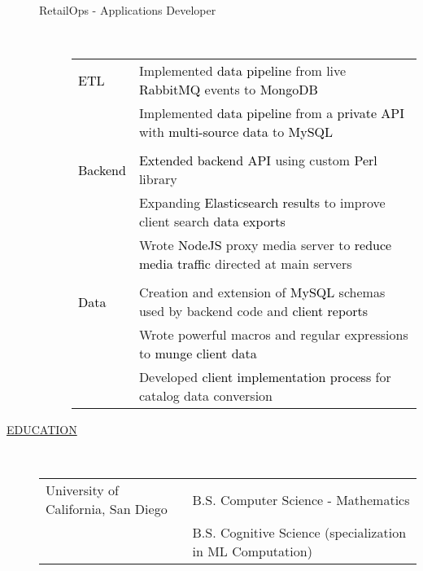 \documentclass[11pt]{article}
\begin{document}
\begin{description}
\begin{description}
                \item[RetailOps - Applications Developer] \hfill\\
                \textcolor{gray}{
                    \begin{tabular}{l|l}
                        \\[-1.0mm]
                        \textcolor{black}{ETL}
                            & Implemented \textcolor{black}{data pipeline} from live \textcolor{black}{RabbitMQ} events to \textcolor{black}{MongoDB}\\
                            & Implemented \textcolor{black}{data pipeline} from a \textcolor{black}{private API} with \textcolor{black}{multi-source data} to \textcolor{black}{MySQL}\\
                        \\[-1.7mm]
                        \textcolor{black}{Backend}
                            & \textcolor{black}{Extended backend API} using custom \textcolor{black}{Perl} library\\
                            & Expanding \textcolor{black}{Elasticsearch results} to improve client search \textcolor{black}{data exports}\\
                            & Wrote \textcolor{black}{NodeJS} proxy media server to \textcolor{black}{reduce media traffic} directed at main servers \\
                        \\[-1.7mm]
                        \textcolor{black}{Data}
                            & Creation and extension of \textcolor{black}{MySQL} schemas used by backend code and \textcolor{black}{client reports}\\
                            & Wrote powerful macros and regular expressions to \textcolor{black}{munge client data}\\
                            & Developed \textcolor{black}{client implementation process} for catalog data conversion\\
                    \end{tabular}
		        }
            \end{description}

        \item[\underline{EDUCATION}]  \hfill \\
            \begin{tabular}{l|l}
                University of California, San Diego & B.S. Computer Science - Mathematics \\
                & B.S. Cognitive Science (specialization in ML Computation)\\
            \end{tabular}



\end{description}
\end{document}
